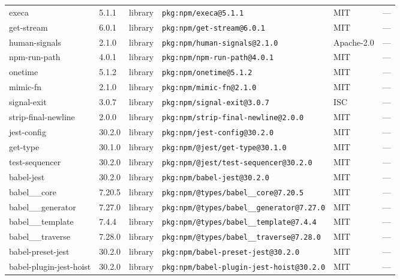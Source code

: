 \documentclass[11pt,a4paper]{article}
\begin{document}
\begin{longtable}{|p{4cm}|p{2cm}|p{1.6cm}|p{5cm}|p{1.5cm}|p{3.5cm}|}
\raggedright execa & 5.1.1 & library & \small\texttt{pkg:npm/execa@5.1.1} & MIT & \small — \\
\raggedright get-stream & 6.0.1 & library & \small\texttt{pkg:npm/get-stream@6.0.1} & MIT & \small — \\
\raggedright human-signals & 2.1.0 & library & \small\texttt{pkg:npm/human-signals@2.1.0} & Apache-2.0 & \small — \\
\raggedright npm-run-path & 4.0.1 & library & \small\texttt{pkg:npm/npm-run-path@4.0.1} & MIT & \small — \\
\raggedright onetime & 5.1.2 & library & \small\texttt{pkg:npm/onetime@5.1.2} & MIT & \small — \\
\raggedright mimic-fn & 2.1.0 & library & \small\texttt{pkg:npm/mimic-fn@2.1.0} & MIT & \small — \\
\raggedright signal-exit & 3.0.7 & library & \small\texttt{pkg:npm/signal-exit@3.0.7} & ISC & \small — \\
\raggedright strip-final-newline & 2.0.0 & library & \small\texttt{pkg:npm/strip-final-newline@2.0.0} & MIT & \small — \\
\raggedright jest-config & 30.2.0 & library & \small\texttt{pkg:npm/jest-config@30.2.0} & MIT & \small — \\
\raggedright get-type & 30.1.0 & library & \small\texttt{pkg:npm/@jest/get-type@30.1.0} & MIT & \small — \\
\raggedright test-sequencer & 30.2.0 & library & \small\texttt{pkg:npm/@jest/test-sequencer@30.2.0} & MIT & \small — \\
\raggedright babel-jest & 30.2.0 & library & \small\texttt{pkg:npm/babel-jest@30.2.0} & MIT & \small — \\
\raggedright babel\_\_core & 7.20.5 & library & \small\texttt{pkg:npm/@types/babel\_\_core@7.20.5} & MIT & \small — \\
\raggedright babel\_\_generator & 7.27.0 & library & \small\texttt{pkg:npm/@types/babel\_\_generator@7.27.0} & MIT & \small — \\
\raggedright babel\_\_template & 7.4.4 & library & \small\texttt{pkg:npm/@types/babel\_\_template@7.4.4} & MIT & \small — \\
\raggedright babel\_\_traverse & 7.28.0 & library & \small\texttt{pkg:npm/@types/babel\_\_traverse@7.28.0} & MIT & \small — \\
\raggedright babel-preset-jest & 30.2.0 & library & \small\texttt{pkg:npm/babel-preset-jest@30.2.0} & MIT & \small — \\
\raggedright babel-plugin-jest-hoist & 30.2.0 & library & \small\texttt{pkg:npm/babel-plugin-jest-hoist@30.2.0} & MIT & \small — \\

\end{longtable}
\end{document}
